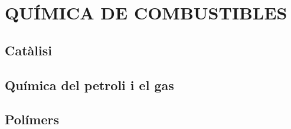 \chapter{QUÍMICA DE COMBUSTIBLES}

\section{Catàlisi}
\section{Química del petroli i el gas}
\section{Polímers}
